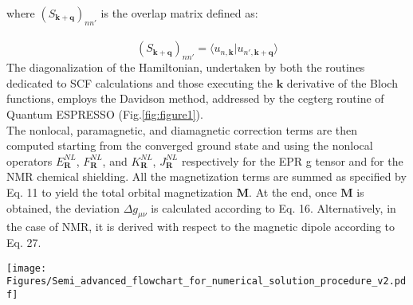 \documentclass[final,3p,times,twocolumn]{elsarticle}
\begin{document}
\begin{small}
where $(S_{\mathbf{k+q}}^{} )_{nn'}$ is the overlap matrix defined as:\\ \\
\begin{equation} 
    (S_{\mathbf{k+q}}^{} )_{nn'}=\langle u_{n, \mathbf{k}}| u_{n', \mathbf{k+q}}\rangle
\end{equation}
The diagonalization of the Hamiltonian, undertaken by both the routines dedicated to SCF calculations and those executing the $\mathbf{k}$ derivative of the Bloch functions, employs the Davidson method, addressed by the {\selectfont cegterg} routine of Quantum ESPRESSO (Fig.\ref{fig:figure1}). \\
The nonlocal, paramagnetic, and diamagnetic correction terms are then computed starting from the converged ground state and using the nonlocal operators $E_{\mathbf{R}}^{NL}$, $F_{\mathbf{R}}^{NL}$, and $K_{\mathbf{R}}^{NL}$, $J_{\mathbf{R}}^{NL}$ respectively for the EPR g tensor and for the NMR chemical shielding. All the magnetization terms are summed as specified by Eq. 11 to yield the total orbital magnetization $\mathbf{M}$. At the end, once $\mathbf{M}$ is obtained, the deviation $\Delta g_{\mu\nu}$ is calculated according to Eq. 16. Alternatively, in the case of NMR, it is derived with respect to the magnetic dipole according to Eq. 27.
\vskip0.5cm
\begin{figure*}
\centering
\texttt{[image: Figures/Semi\_advanced\_flowchart\_for\_numerical\_solution\_procedure\_v2.pdf]}
\caption{Schematic view of the process to calculate the orbital magnetization in {\selectfont QE-CONVERSE} code. }
\label{fig:figure1}
\end{figure*}

\end{small}
\end{document}
